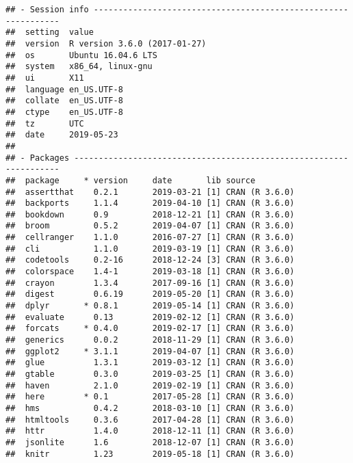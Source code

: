 \documentclass[]{book}
\begin{document}
\begin{verbatim}
## - Session info ---------------------------------------------------------------
##  setting  value                       
##  version  R version 3.6.0 (2017-01-27)
##  os       Ubuntu 16.04.6 LTS          
##  system   x86_64, linux-gnu           
##  ui       X11                         
##  language en_US.UTF-8                 
##  collate  en_US.UTF-8                 
##  ctype    en_US.UTF-8                 
##  tz       UTC                         
##  date     2019-05-23                  
## 
## - Packages -------------------------------------------------------------------
##  package     * version     date       lib source                           
##  assertthat    0.2.1       2019-03-21 [1] CRAN (R 3.6.0)                   
##  backports     1.1.4       2019-04-10 [1] CRAN (R 3.6.0)                   
##  bookdown      0.9         2018-12-21 [1] CRAN (R 3.6.0)                   
##  broom         0.5.2       2019-04-07 [1] CRAN (R 3.6.0)                   
##  cellranger    1.1.0       2016-07-27 [1] CRAN (R 3.6.0)                   
##  cli           1.1.0       2019-03-19 [1] CRAN (R 3.6.0)                   
##  codetools     0.2-16      2018-12-24 [3] CRAN (R 3.6.0)                   
##  colorspace    1.4-1       2019-03-18 [1] CRAN (R 3.6.0)                   
##  crayon        1.3.4       2017-09-16 [1] CRAN (R 3.6.0)                   
##  digest        0.6.19      2019-05-20 [1] CRAN (R 3.6.0)                   
##  dplyr       * 0.8.1       2019-05-14 [1] CRAN (R 3.6.0)                   
##  evaluate      0.13        2019-02-12 [1] CRAN (R 3.6.0)                   
##  forcats     * 0.4.0       2019-02-17 [1] CRAN (R 3.6.0)                   
##  generics      0.0.2       2018-11-29 [1] CRAN (R 3.6.0)                   
##  ggplot2     * 3.1.1       2019-04-07 [1] CRAN (R 3.6.0)                   
##  glue          1.3.1       2019-03-12 [1] CRAN (R 3.6.0)                   
##  gtable        0.3.0       2019-03-25 [1] CRAN (R 3.6.0)                   
##  haven         2.1.0       2019-02-19 [1] CRAN (R 3.6.0)                   
##  here        * 0.1         2017-05-28 [1] CRAN (R 3.6.0)                   
##  hms           0.4.2       2018-03-10 [1] CRAN (R 3.6.0)                   
##  htmltools     0.3.6       2017-04-28 [1] CRAN (R 3.6.0)                   
##  httr          1.4.0       2018-12-11 [1] CRAN (R 3.6.0)                   
##  jsonlite      1.6         2018-12-07 [1] CRAN (R 3.6.0)                   
##  knitr         1.23        2019-05-18 [1] CRAN (R 3.6.0)                   

\end{verbatim}
\end{document}

